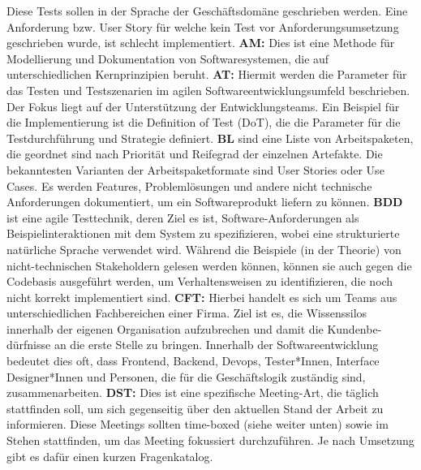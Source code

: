 Diese Tests sollen in der Sprache der Geschäftsdomäne geschrieben werden. Eine Anforderung bzw. User Story für welche kein Test vor Anforderungsumsetzung geschrieben wurde, ist schlecht implementiert.\cite{Downs2011-uk}
\newline
\textbf{AM:} Dies ist eine Methode für Modellierung und Dokumentation von Softwaresystemen, die auf unterschiedlichen Kernprinzipien beruht.\cite{Ambler2010-te}
\newline
\textbf{AT:} Hiermit werden die Parameter für das Testen und Testszenarien im agilen Softwareentwicklungsumfeld beschrieben. Der Fokus liegt auf der Unterstützung der Entwicklungsteams. 
Ein Beispiel für die Implementierung ist die Definition of Test (DoT), die die Parameter für die Testdurchführung und Strategie definiert. \cite{Crispin2009}
\newline
\textbf{BL} sind eine Liste von Arbeitspaketen, die geordnet sind nach Priorität und Reifegrad der einzelnen Artefakte. Die bekanntesten Varianten der Arbeitspaketformate sind User Stories oder Use Cases. 
Es werden Features, Problemlösungen und andere nicht technische Anforderungen dokumentiert, um ein Softwareprodukt liefern zu können.\cite{Svensson2019-pq}
\newline
\textbf{BDD} ist eine agile Testtechnik, deren Ziel es ist, Software-Anforderungen als Beispielinteraktionen mit dem System zu spezifizieren,
wobei eine strukturierte natürliche Sprache verwendet wird. Während die Beispiele (in der Theorie) von nicht-technischen Stakeholdern gelesen werden können, 
können sie auch gegen die Codebasis ausgeführt werden, um Verhaltensweisen zu identifizieren, die noch nicht korrekt implementiert sind. \cite{Binamungu2020-wt}
\newline
\textbf{CFT:} Hierbei handelt es sich um Teams aus unterschiedlichen Fachbereichen einer Firma. Ziel ist es, die Wissenssilos innerhalb der eigenen Organisation aufzubrechen und damit die Kundenbe-dürfnisse an die erste Stelle zu bringen. 
Innerhalb der Softwareentwicklung bedeutet dies oft, dass Frontend, Backend, Devops, Tester*Innen, Interface Designer*Innen und Personen, die für die Geschäftslogik zuständig sind, zusammenarbeiten.\cite{McDonough2000-fi}
\newline
\textbf{DST:} Dies ist eine spezifische Meeting-Art, die täglich stattfinden soll, um sich gegenseitig über den aktuellen Stand der Arbeit zu informieren. 
Diese Meetings sollten time-boxed (siehe weiter unten) sowie im Stehen stattfinden, um das Meeting fokussiert durchzuführen. Je nach Umsetzung gibt es dafür einen kurzen Fragenkatalog.\cite{Stray2016-me}
